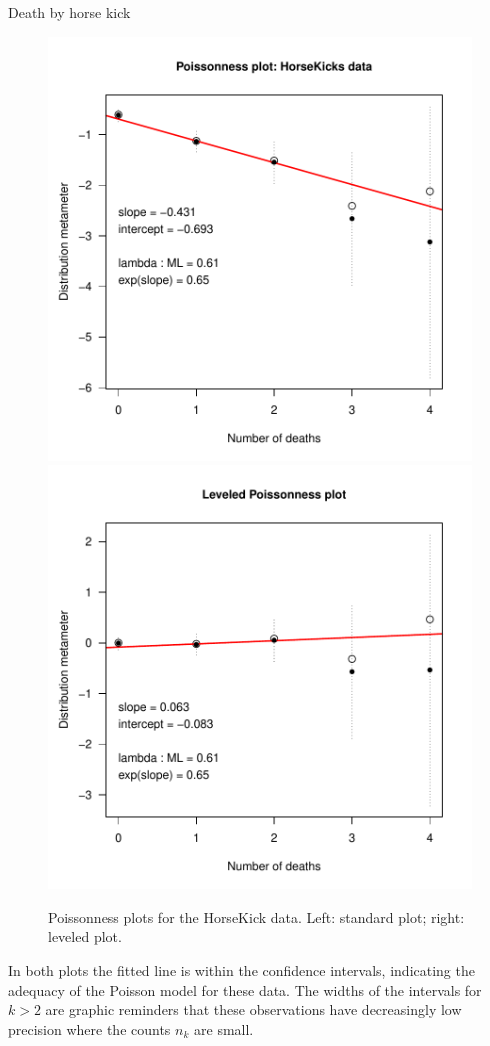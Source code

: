 \documentclass[10pt,krantz2]{krantz}\usepackage[]{graphicx}\usepackage[]{color}
\begin{document}
\begin{Example}[horsekick4]{Death by horse kick}
\begin{figure}[htbp]
\centerline{
\includegraphics[width=.48\textwidth]{ch03/fig/distplot1}
\includegraphics[width=.48\textwidth]{ch03/fig/distplot2}
}
\caption[Poissonness plots for the HorseKick data]{Poissonness plots for the HorseKick data. Left: standard plot; right: leveled plot.\label{fig:distplot1}}
\end{figure}


In both plots the fitted line is within the confidence intervals,
indicating the adequacy of the Poisson model for these data.
The widths of the intervals for $k > 2$ are graphic reminders that these observations
have decreasingly low precision where the counts $n_k$ are small.

\end{Example}

\end{document}
